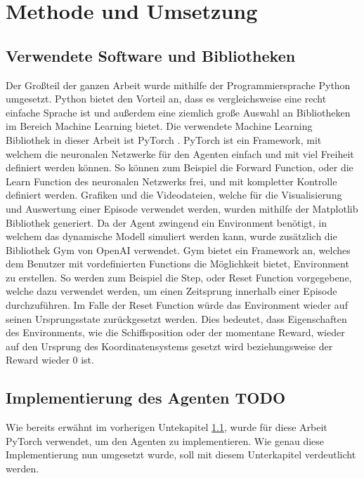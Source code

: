 \documentclass[]{iat}
\begin{document}
\chapter{Methode und Umsetzung} \label{sec:methode_umsetzung}

\section{Verwendete Software und Bibliotheken} \label{sec:software_bibs}
Der Großteil der ganzen Arbeit wurde mithilfe der Programmiersprache Python \cite[]{python} umgesetzt. Python bietet den Vorteil an, dass es vergleichsweise eine recht einfache Sprache ist und außerdem eine ziemlich große Auswahl an Bibliotheken im Bereich Machine Learning bietet. Die verwendete Machine Learning Bibliothek in dieser Arbeit ist PyTorch \cite[]{pytorch}. PyTorch ist ein Framework, mit welchem die neuronalen Netzwerke für den Agenten einfach und mit viel Freiheit definiert werden können. So können zum Beispiel die Forward Function, oder die Learn Function des neuronalen Netzwerks frei, und mit kompletter Kontrolle definiert werden. Grafiken und die Videodateien, welche für die Visualisierung und Auswertung einer Episode verwendet werden, wurden mithilfe der Matplotlib \cite[]{matpltlib} Bibliothek generiert. Da der Agent zwingend ein Environment benötigt, in welchem das dynamische Modell simuliert werden kann, wurde zusätzlich die Bibliothek Gym von OpenAI \cite[]{brockman2016openai} verwendet. Gym bietet ein Framework an, welches dem Benutzer mit vordefinierten Functions die Möglichkeit bietet, Environment zu erstellen. So werden zum Beispiel die Step, oder Reset Function vorgegebene, welche dazu verwendet werden, um einen Zeitsprung innerhalb einer Episode durchzuführen. Im Falle der Reset Function würde das Environment wieder auf seinen Ursprungsstate zurückgesetzt werden. Dies bedeutet, dass Eigenschaften des Environments, wie die Schiffsposition oder der momentane Reward, wieder auf den Ursprung des Koordinatensystems gesetzt wird beziehungsweise der Reward wieder 0 ist.
\section{Implementierung des Agenten TODO} \label{sec:imp_agent}
Wie bereits erwähnt im vorherigen Untekapitel \ref{sec:software_bibs}, wurde für diese Arbeit PyTorch verwendet, um den Agenten zu implementieren. Wie genau diese Implementierung nun umgesetzt wurde, soll mit diesem Unterkapitel verdeutlicht werden.
\end{document}
